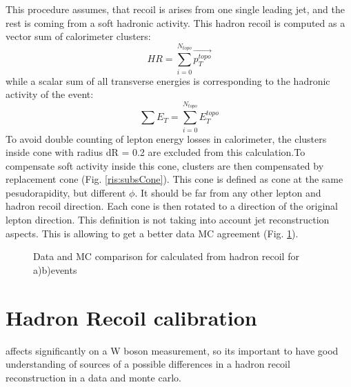 This procedure assumes, that recoil is arises from one single leading jet, and the rest  is coming from a soft hadronic activity. This hadron recoil is computed as a vector sum of calorimeter clusters:
\begin{equation}
HR= \sum_{i=0}^{N_{topo}}\vec{p_T^{topo}}
\end{equation}
while a scalar sum of all transverse energies is corresponding to the hadronic activity of the event:
\begin{equation}\label{eq:sumet}
\sum E_T =\sum_{i=0}^{N_{topo}} E_T^{topo}
\end{equation}
To avoid double counting of lepton energy losses in calorimeter, the clusters inside cone with radius dR = 0.2 are excluded from this calculation.To compensate soft activity inside this cone, clusters are then compensated by replacement cone (Fig. \ref{ris:subsCone}). This cone is defined as cone at the same pesudorapidity, but different $\phi$. It should be far from any other lepton and hadron recoil direction. Each cone is then rotated to a direction of the original lepton direction. This definition is not taking into account jet reconstruction aspects.   This is allowing to get a better data MC agreement (Fig. \ref{ris:HadrRecoilEtMiss}).


\begin{figure}[!tbp]
\begin{minipage}[h]{0.49\linewidth}
\end{minipage}
\hfill
\begin{minipage}[h]{0.49\linewidth}
\end{minipage}
\caption{Data and MC comparison for \etmiss calculated from hadron recoil for a)\wenu b)\wmunu events}
\label{ris:HadrRecoilEtMiss}
\end{figure}



\section{Hadron Recoil calibration}\label{sec:HadrCalib}
\etmiss affects significantly on a W boson measurement, so its important to have good understanding of sources of a possible differences in a hadron recoil reconstruction in a data and monte carlo. 

